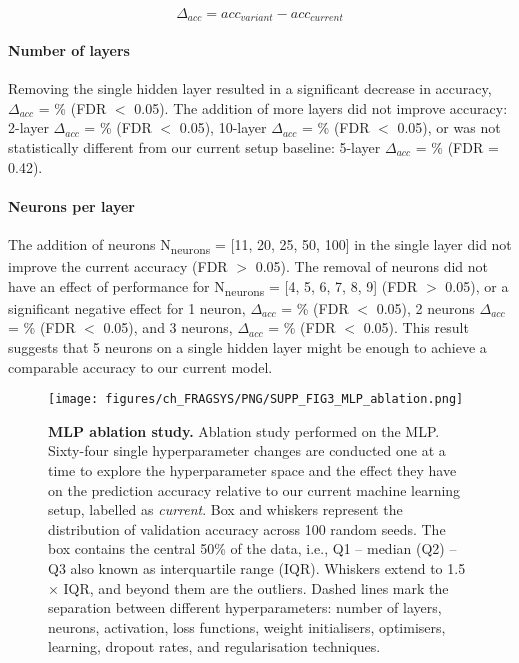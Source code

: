 \begin{equation}
\Delta_{acc} = acc_{variant} - acc_{current}
\label{eq:delta_accuracy}
\end{equation}
\vspace{-37pt} %

\paragraph{Number of layers}

Removing the single hidden layer resulted in a significant decrease in accuracy, $\Delta_{acc}$ = \% (FDR $<$ 0.05). The addition of more layers did not improve accuracy: 2-layer  $\Delta_{acc}$ = \% (FDR $<$ 0.05), 10-layer $\Delta_{acc}$ = \% (FDR $<$ 0.05), or was not statistically different from our current setup baseline: 5-layer $\Delta_{acc}$ = \% (FDR = 0.42).

\paragraph{Neurons per layer}

The addition of neurons N\textsubscript{neurons} = [11, 20, 25, 50, 100] in the single layer did not improve the current accuracy (FDR $>$ 0.05). The removal of neurons did not have an effect of performance for N\textsubscript{neurons} = [4, 5, 6, 7, 8, 9] (FDR $>$ 0.05), or a significant negative effect for 1 neuron, $\Delta_{acc}$ = \% (FDR $<$ 0.05), 2 neurons $\Delta_{acc}$ = \% (FDR $<$ 0.05), and 3 neurons, $\Delta_{acc}$ = \% (FDR $<$ 0.05). This result suggests that 5 neurons on a single hidden layer might be enough to achieve a comparable accuracy to our current model.

\begin{figure}[ht!]
    \centering
    \texttt{[image: figures/ch\_FRAGSYS/PNG/SUPP\_FIG3\_MLP\_ablation.png]}
    \caption[MLP ablation study]{\textbf{MLP ablation study.} Ablation study performed on the MLP. Sixty-four single hyperparameter changes are conducted one at a time to explore the hyperparameter space and the effect they have on the prediction accuracy relative to our current machine learning setup, labelled as \textit{current}. Box and whiskers represent the distribution of validation accuracy across 100 random seeds. The box contains the central 50\% of the data, i.e., Q1 – median (Q2) – Q3  also known as interquartile range (IQR). Whiskers extend to 1.5 $\times$ IQR, and beyond them are the outliers. Dashed lines mark the separation between different hyperparameters: number of layers, neurons, activation, loss functions, weight initialisers, optimisers, learning, dropout rates, and regularisation techniques.}
    \label{fig:mlp_ablation}
\end{figure}

